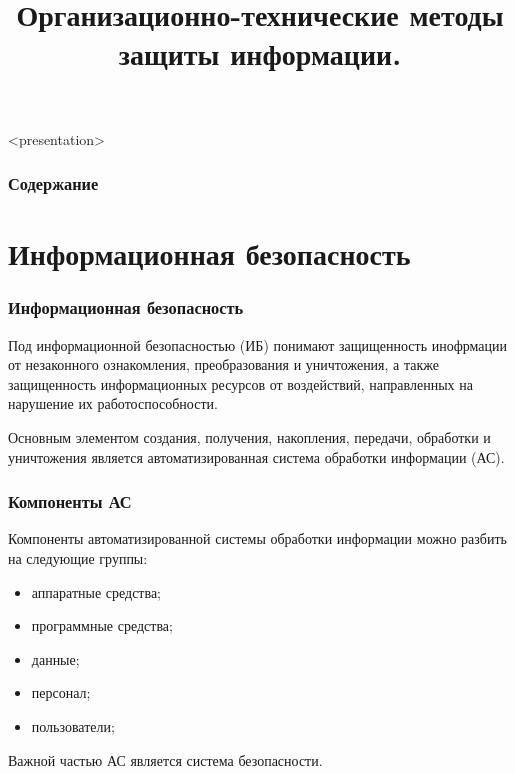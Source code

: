 

\title[Орг-тех методы]{Организационно-технические методы защиты информации.}






\begin{frame}<presentation>
\frametitle{Содержание}
\tableofcontents
\end{frame}


\section{Информационная безопасность}


\begin{frame}
\frametitle{Информационная безопасность}
\begin{definition}%
Под \alert{информационной безопасностью (ИБ)} понимают защищенность инофрмации от незаконного ознакомления, преобразования и уничтожения, а также защищенность информационных ресурсов от воздействий, направленных на нарушение их работоспособности.
\end{definition}
\end{frame}

Основным элементом создания, получения, накопления, передачи, обработки и уничтожения является автоматизированная система обработки информации (АС).

\begin{frame}
\frametitle{Компоненты АС}
Компоненты автоматизированной системы обработки информации можно разбить на следующие группы:
\begin{itemize}
    \item аппаратные средства;
    \item программные средства;
    \item данные;
    \item персонал;
    \item пользователи;
\end{itemize}
\end{frame}

Важной частью АС является система безопасности.

